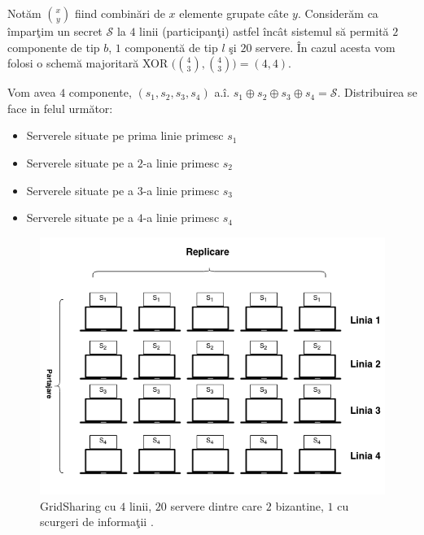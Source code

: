 \documentclass{llncs}
\begin{document}
\begin{example}

	Not\u{a}m ${x \choose y}$ fiind combin\u{a}ri de $x$ elemente grupate c\^{a}te $y$.
	Consider\u{a}m ca \^{i}mpar\c{t}im un secret $\mathcal{S}$ la $4$ linii (participan\c{t}i) astfel \^{i}nc\^{a}t sistemul s\u{a} permit\u{a} $2$ componente de tip $b$, $1$ component\u{a} de tip $l$ \c{s}i $20$ servere. \^{I}n cazul acesta vom folosi o schem\u{a} majoritar\u{a} XOR $\big( {4 \choose 3}, {4 \choose 3}\big) = (4,4)$.

	Vom avea $4$ componente, $(s_1, s_2, s_3, s_4)$ a.\^{i}. $s_1 \oplus s_2 \oplus s_3 \oplus s_4 = \mathcal{S}$.
	Distribuirea se face in felul urm\u{a}tor:
	\begin{itemize}
		\item Serverele situate pe prima linie primesc $s_1$
		\item Serverele situate pe a $2$-a linie primesc $s_2$
		\item Serverele situate pe a $3$-a linie primesc $s_3$
		\item Serverele situate pe a $4$-a linie primesc $s_4$
	\end{itemize}
\end{example}

\begin{figure}[H]
	\includegraphics[width=12cm]{img/GridSharing.png}    %
	\caption{GridSharing cu $4$ linii, $20$ servere dintre care $2$ bizantine, $1$ cu scurgeri de informa\c{t}ii \cite{SB:2005}.}
	\label{fig:grid_sharing}
	\bigskip
\end{figure}
\end{document}
